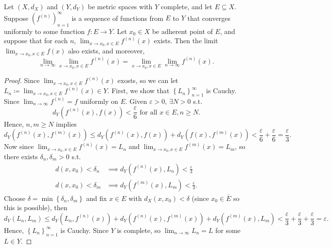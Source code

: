 \begin{proposition}
    Let \((X, d_X)\) and \((Y, d_Y)\) be metric spaces with \(Y\) complete, and let \(E \subseteq X\). Suppose \(\left( f^{(n)} \right)_{n=1}^{\infty}  \) is a sequence of functions from \(E\) to \(Y\) that converges uniformly to some function \(f:E \to Y\). Let \(x_0 \in X\) be adherent point of \(E\), and suppose that for each \(n\), \(\lim_{x \to x_0, x \in E} f^{(n)}(x)\) exists. Then the limit \(\lim_{x \to x_0, x \in E} f(x) \) also exists, and moreover, 
    \[
        \lim_{n \to \infty} \lim_{x \to x_0, x \in E} f^{(n)}(x) = \lim_{x \to x_0, x \in E} \lim_{n \to \infty}  f^{(n)}(x). 
    \]             
\end{proposition}
\begin{proof}
    Since \(\lim_{x \to x_0, x \in E} f^{(n)}(x) \) exosts, so we can let \(L_n \coloneqq \lim_{x \to x_0, x \in E} f^{(n)}(x) \in Y \). First, we show that \(\left\{ L_n \right\}_{n=1}^{\infty }  \) is Cauchy. Since \(\lim_{n \to \infty} f^{(n)} = f \) uniformly on \(E\). Given \(\varepsilon > 0\), \(\exists N > 0\) s.t. 
    \[
        d_Y \left( f^{(n)}(x), f(x) \right) < \frac{\varepsilon}{6} \text{ for all } x \in E, n \ge N. 
    \] 
    Hence, \(n, m \ge N\) implies 
    \[
        d_Y \left( f^{(n)}(x), f^{(m)}(x) \right) \le d_Y \left( f^{(n)}(x), f(x) \right) + d_Y \left( f(x), f^{(m)}(x) \right) < \frac{\varepsilon}{6} + \frac{\varepsilon}{6} = \frac{\varepsilon}{3}.   
    \] Now since \(\lim_{x \to x_0, x \in E} f^{(n)}(x) = L_n \) and \(\lim_{x \to x_0, x \in E} f^{(m)}(x) = L_m\), so there exists \(\delta _n, \delta _m > 0\) s.t. 
    \begin{align*}
        d(x, x_0) < \delta _n &\implies d_Y \left( f^{(n)}(x), L_n \right) < \frac{\varepsilon}{3} \\
        d(x, x_0) < \delta _m &\implies d_Y \left( f^{(m)}(x), L_m \right) < \frac{\varepsilon}{3}. 
    \end{align*}  
    Choose \(\delta = \min \left\{ \delta _n, \delta _m \right\} \) and fix \(x \in E\) with \(d_X (x, x_0) < \delta \) (since \(x_0 \in \overline{E} \) so this is possible), then 
    \[
        d_Y \left( L_n, L_m \right) \le d_Y \left( L_n, f^{(n)}(x) \right) + d_Y \left( f^{(n)}(x), f^{(m)}(x) \right) + d_Y \left( f^{(m)}(x), L_m \right) < \frac{\varepsilon}{3} + \frac{\varepsilon}{3} + \frac{\varepsilon}{3} = \varepsilon.    
    \] 
    Hence, \(\left\{ L_n \right\}_{n=1}^{\infty}  \) is Cauchy. Since \(Y\) is complete, so \(\lim_{n \to \infty} L_n = L \) for some \(L \in Y\). 

\end{proof}
